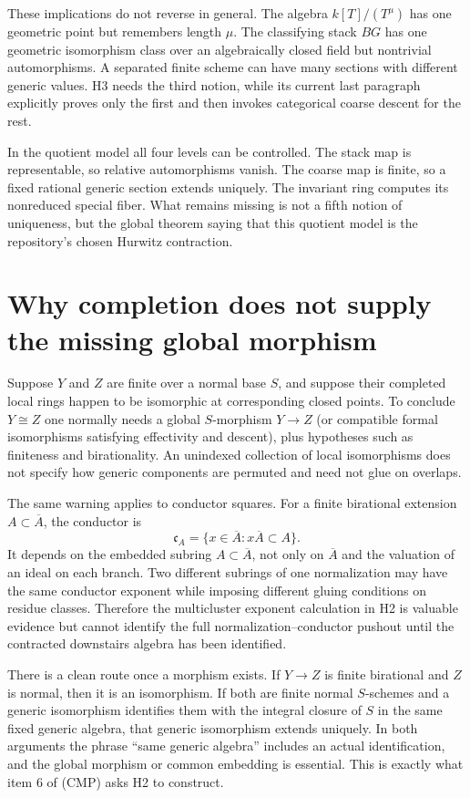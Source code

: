 \documentclass[11pt]{article}
\newcommand{\ol}{\overline}
\begin{document}
These implications do not reverse in general.  The algebra
$k[T]/(T^\mu)$ has one geometric point but remembers length $\mu$.  The
classifying stack $BG$ has one geometric isomorphism class over an
algebraically closed field but nontrivial automorphisms.  A separated finite
scheme can have many sections with different generic values.  H3 needs the
third notion, while its current last paragraph explicitly proves only the
first and then invokes categorical coarse descent for the rest.

In the quotient model all four levels can be controlled.  The stack map is
representable, so relative automorphisms vanish.  The coarse map is finite,
so a fixed rational generic section extends uniquely.  The invariant ring
computes its nonreduced special fiber.  What remains missing is not a fifth
notion of uniqueness, but the global theorem saying that this quotient model
is the repository's chosen Hurwitz contraction.

\section{Why completion does not supply the missing global morphism}

Suppose $Y$ and $Z$ are finite over a normal base $S$, and suppose their
completed local rings happen to be isomorphic at corresponding closed
points.  To conclude $Y\cong Z$ one normally needs a global $S$-morphism
$Y\to Z$ (or compatible formal isomorphisms satisfying effectivity and
descent), plus hypotheses such as finiteness and birationality.  An
unindexed collection of local isomorphisms does not specify how generic
components are permuted and need not glue on overlaps.

The same warning applies to conductor squares.  For a finite birational
extension $A\subset\ol A$, the conductor is
\[
 \mathfrak c_A=\{x\in\ol A:x\ol A\subset A\}.
\]
It depends on the embedded subring $A\subset\ol A$, not only on $\ol A$ and
the valuation of an ideal on each branch.  Two different subrings of one
normalization may have the same conductor exponent while imposing different
gluing conditions on residue classes.  Therefore the multicluster exponent
calculation in H2 is valuable evidence but cannot identify the full
normalization--conductor pushout until the contracted downstairs algebra has
been identified.

There is a clean route once a morphism exists.  If $Y\to Z$ is finite
birational and $Z$ is normal, then it is an isomorphism.  If both are finite
normal $S$-schemes and a generic isomorphism identifies them with the
integral closure of $S$ in the same fixed generic algebra, that generic
isomorphism extends uniquely.  In both arguments the phrase ``same generic
algebra'' includes an actual identification, and the global morphism or
common embedding is essential.  This is exactly what item 6 of (CMP) asks
H2 to construct.
\end{document}

